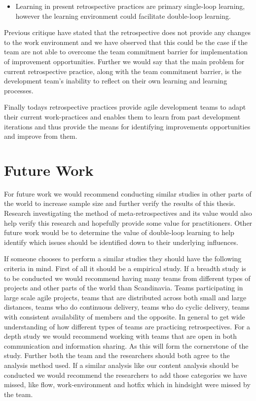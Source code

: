 \begin{itemize}
\item Learning in present retrospective practices are primary single-loop learning, however the learning environment could facilitate double-loop learning.
\end{itemize}

Previous critique \cite{Drury2012} have stated that the retrospective does not provide any changes to the work environment and we have observed that this could be the case if the team are not able to overcome the team commitment barrier for implementation of improvement opportunities. Further we would say that the main problem for current retrospective practice, along with the team commitment barrier, is the development team's inability to reflect on their own learning and learning processes. 

Finally todays retrospective practices provide agile development teams to adapt their current work-practices and enables them to learn from past development iterations and thus provide the means for identifying improvements opportunities and improve from them. 

\section{Future Work}

For future work we would recommend conducting similar studies in other parts of the world to increase sample size and further verify the results of this thesis. Research investigating the method of meta-retrospectives and its value would also help verify this research and hopefully provide some value for practitioners. Other future work would be to determine the value of double-loop learning to help identify which issues should be identified down to their underlying influences. 

If someone chooses to perform a similar studies they should have the following criteria in mind. First of all it should be a empirical study\cite{Dyba2008}. If a breadth study is to be conducted we would recommend having many teams from different types of projects and other parts of the world than Scandinavia. Teams participating in large scale agile projects, teams that are distributed across both small and large distances, teams who do continuous delivery, teams who do cyclic delivery, teams with consistent availability of members and the opposite. In general to get wide understanding of how different types of teams are practicing retrospectives. For a depth study we would recommend working with teams that are open in both communication and information sharing. As this will form the cornerstone of the study. Further both the team and the researchers should both agree to the analysis method used. If a similar analysis like our content analysis should be conducted we would recommend the researchers to add those categories we have missed, like flow, work-environment and hotfix which in hindsight were missed by the team. 

